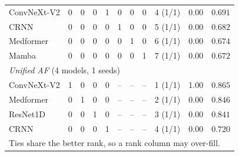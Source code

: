 \begin{table}[ht]
\begin{tabular}{lcccccccccc}
ConvNeXt-V2 & 0 & 0 & 0 & 1 & 0 & 0 & 0 & 4 (1/1) & 0.00 & $0.691$ \\
CRNN & 0 & 0 & 0 & 0 & 1 & 0 & 0 & 5 (1/1) & 0.00 & $0.682$ \\
Medformer & 0 & 0 & 0 & 0 & 0 & 1 & 0 & 6 (1/1) & 0.00 & $0.674$ \\
Mamba & 0 & 0 & 0 & 0 & 0 & 0 & 1 & 7 (1/1) & 0.00 & $0.672$ \\
\midrule
\multicolumn{11}{l}{\textit{Unified AF} (4 models, 1 seeds)} \\
ConvNeXt-V2 & 1 & 0 & 0 & 0 & -- & -- & -- & 1 (1/1) & 1.00 & $0.865$ \\
Medformer & 0 & 1 & 0 & 0 & -- & -- & -- & 2 (1/1) & 0.00 & $0.846$ \\
ResNet1D & 0 & 0 & 1 & 0 & -- & -- & -- & 3 (1/1) & 0.00 & $0.841$ \\
CRNN & 0 & 0 & 0 & 1 & -- & -- & -- & 4 (1/1) & 0.00 & $0.720$ \\
\midrule
\multicolumn{11}{l}{\footnotesize Ties share the better rank, so a rank column may over-fill.} \\
\bottomrule
\end{tabular}
\end{table}
